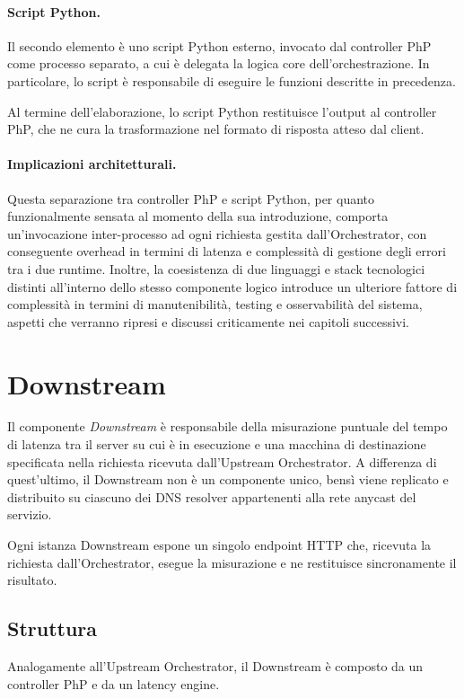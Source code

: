 \paragraph{Script Python.} Il secondo elemento è uno script Python esterno, invocato dal controller PhP come processo separato, a cui è delegata la logica core dell'orchestrazione. In particolare, lo script è responsabile di eseguire le funzioni descritte in precedenza.

Al termine dell'elaborazione, lo script Python restituisce l'output al controller PhP, che ne cura la trasformazione nel formato di risposta atteso dal client.

\paragraph{Implicazioni architetturali.} Questa separazione tra controller PhP e script Python, per quanto funzionalmente sensata al momento della sua introduzione, comporta un'invocazione inter-processo ad ogni richiesta gestita dall'Orchestrator, con conseguente overhead in termini di latenza e complessità di gestione degli errori tra i due runtime.
Inoltre, la coesistenza di due linguaggi e stack tecnologici distinti all'interno dello stesso componente logico introduce un ulteriore fattore di complessità in termini di manutenibilità, testing e osservabilità del sistema, aspetti che verranno ripresi e discussi criticamente nei capitoli successivi.
\section{Downstream}
\label{section:downstream}

Il componente \emph{Downstream} è responsabile della misurazione puntuale del tempo di latenza tra il server su cui è in esecuzione e una macchina di destinazione specificata nella richiesta ricevuta dall'Upstream Orchestrator.
A differenza di quest'ultimo, il Downstream non è un componente unico, bensì viene replicato e distribuito su ciascuno dei \ac{DNS} resolver appartenenti alla rete anycast del servizio.

Ogni istanza Downstream espone un singolo endpoint \ac{HTTP} che, ricevuta la richiesta dall'Orchestrator, esegue la misurazione e ne restituisce sincronamente il risultato.

\subsection{Struttura}
Analogamente all'Upstream Orchestrator, il Downstream è composto da un controller PhP e da un latency engine.

